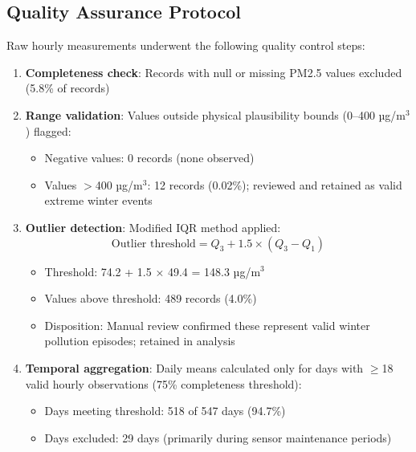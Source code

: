 \documentclass[11pt,a4paper]{article}
\begin{document}
\subsection{Quality Assurance Protocol}

Raw hourly measurements underwent the following quality control steps:

\begin{enumerate}
    \item \textbf{Completeness check}: Records with null or missing PM2.5 values excluded (5.8\% of records)
    
    \item \textbf{Range validation}: Values outside physical plausibility bounds (0--400 µg/m$^3$) flagged:
    \begin{itemize}
        \item Negative values: 0 records (none observed)
        \item Values $>$400 µg/m$^3$: 12 records (0.02\%); reviewed and retained as valid extreme winter events
    \end{itemize}
    
    \item \textbf{Outlier detection}: Modified IQR method applied:
    \begin{equation}
        \text{Outlier threshold} = Q_3 + 1.5 \times (Q_3 - Q_1)
    \end{equation}
    \begin{itemize}
        \item Threshold: 74.2 + 1.5 × 49.4 = 148.3 µg/m$^3$
        \item Values above threshold: 489 records (4.0\%)
        \item Disposition: Manual review confirmed these represent valid winter pollution episodes; retained in analysis
    \end{itemize}
    
    \item \textbf{Temporal aggregation}: Daily means calculated only for days with $\geq$18 valid hourly observations (75\% completeness threshold):
    \begin{itemize}
        \item Days meeting threshold: 518 of 547 days (94.7\%)
        \item Days excluded: 29 days (primarily during sensor maintenance periods)
    \end{itemize}
\end{enumerate}
\end{document}
